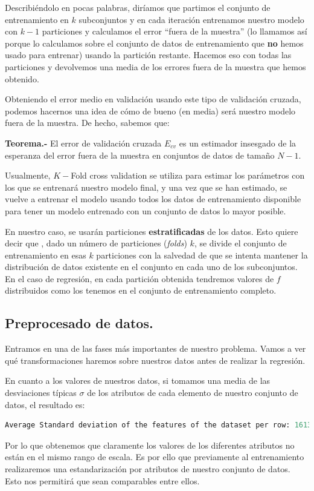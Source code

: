\documentclass[a4paper, 20pt]{article}
\begin{document}
Describiéndolo en pocas palabras, diríamos que partimos el conjunto de entrenamiento en $k$ subconjuntos y en cada iteración entrenamos nuestro modelo
con $k-1$ particiones y calculamos el error ``fuera de la muestra'' (lo llamamos así porque lo calculamos sobre el conjunto de datos de entrenamiento que \textbf{no} hemos usado para entrenar) usando la partición restante. Hacemos eso con todas las particiones y devolvemos una media de
los errores fuera de la muestra que hemos obtenido.

Obteniendo el error medio en validación usando este tipo de validación cruzada, podemos hacernos una idea de cómo de bueno (en media) será nuestro modelo fuera de la muestra. De hecho, sabemos que:

\textbf{Teorema.-} El error de validación cruzada $E_{cv}$ es un estimador insesgado de la esperanza del error fuera de la muestra en conjuntos de datos de tamaño $N-1$.

Usualmente, $K-$Fold cross validation se utiliza para estimar los parámetros con los que se entrenará nuestro modelo final, y una vez que se han estimado, se vuelve a entrenar el modelo usando
todos los datos de entrenamiento disponible para tener un modelo entrenado con un conjunto de datos lo mayor posible.


En nuestro caso, se usarán particiones \textbf{estratificadas} de los datos. Esto quiere decir que , dado un número de particiones (\emph{folds}) $k$, se divide el conjunto de entrenamiento en esas $k$ particiones con la salvedad de que se intenta mantener la distribución de datos existente en el conjunto en cada uno de los subconjuntos. En el caso de regresión, en cada partición obtenida tendremos valores de $f$ distribuidos como los tenemos en el conjunto de entrenamiento completo.

\subsection{Preprocesado de datos.}

Entramos en una de las fases más importantes de nuestro problema. Vamos a ver qué transformaciones haremos sobre nuestros datos antes de realizar la regresión.


En cuanto a los valores de nuestros datos, si tomamos una media de las desviaciones típicas $\sigma$ de los atributos de cada elemento de nuestro conjunto de datos, el resultado es:
\begin{lstlisting}[language = Python]
  Average Standard deviation of the features of the dataset per row: 1613.81306
\end{lstlisting}
Por lo que obtenemos que claramente los valores de los diferentes atributos no están en el mismo rango de escala. Es por ello que previamente al entrenamiento realizaremos una estandarización por atributos de nuestro conjunto de datos. Esto nos permitirá que sean comparables entre ellos.
\end{document}
